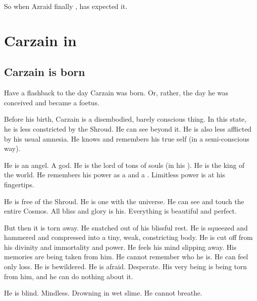 So when Azraid finally , \Ishnaruchaefir has expected it. 



















\section{Carzain in \Redce}









\subsection{Carzain is born}
Have a flashback to the day Carzain was born. 
Or, rather, the day he was conceived and became a foetus.

Before his birth, Carzain is a disembodied, barely conscious thing. 
In this state, he is less constricted by the Shroud. 
He can see beyond it.
He is also less afflicted by his usual \malach amnesia.
He knows and remembers his true self (in a semi-conscious way). 

He is an angel.
A god. 
He is the lord of tons of souls (in his \carcer).
He is the king of the world. 
He remembers his power as a \sathariah and a \malach.
Limitless power is at his fingertips. 

He is free of the Shroud. 
He is one with the universe. 
He can see and touch the entire Cosmos.
All bliss and glory is his. 
Everything is beautiful and perfect. 

But then it is torn away. 
He snatched out of his blissful rest. 
He is squeezed and hammered and compressed into a tiny, weak, constricting body. 
He is cut off from his divinity and immortality and power. 
He feels his mind slipping away.
His memories are being taken from him. 
He cannot remember who he is.
He can feel only loss. 
He is bewildered. 
He is afraid.
Desperate. 
His very being is being torn from him, and he can do nothing about it. 

He is blind. 
Mindless. 
Drowning in wet slime. 
He cannot breathe.

